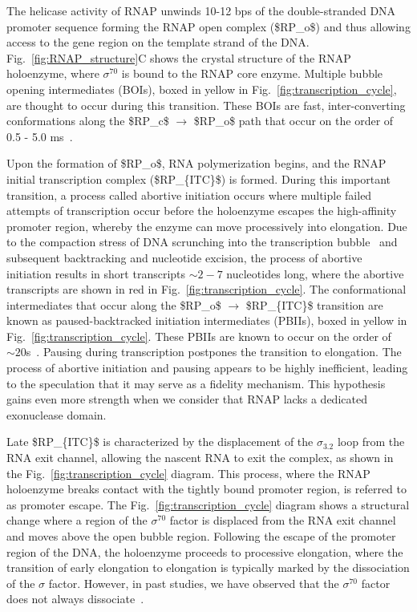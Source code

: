 The helicase activity of RNAP unwinds 10-12 \ac{bp}s of the double-stranded DNA promoter sequence forming the RNAP open complex (\ac{$RP_o$}) and thus allowing access to the gene region on the template strand of the DNA. 
Fig.~\ref{fig:RNAP_structure}C shows the crystal structure of the RNAP holoenzyme, where $\sigma^{70}$ is bound to the RNAP core enzyme. 
Multiple bubble opening intermediates (\ac{BOIs}), boxed in yellow in Fig.~\ref{fig:transcription_cycle}, are thought to occur during this transition. 
These \ac{BOIs} are fast, inter-converting conformations along the \ac{$RP_c$} $\rightarrow$ \ac{$RP_o$} path that occur on the order of 0.5 - 5.0 ms~\cite{lerner_JCP_2018, robb_JMB_2013}.

Upon the formation of \ac{$RP_o$}, RNA polymerization begins, and the RNAP initial transcription complex (\ac{$RP_{ITC}$}) is formed.
During this important transition, a process called abortive initiation occurs where multiple failed attempts of transcription occur before the holoenzyme escapes the high-affinity promoter region, whereby the enzyme can move processively into elongation. 
Due to the compaction stress of DNA scrunching into the transcription bubble~\cite{kapanidis_science_2006} and subsequent backtracking and nucleotide excision, the process of abortive initiation results in short transcripts $\sim2-7$ nucleotides long, where the abortive transcripts are shown in red in Fig.~\ref{fig:transcription_cycle}.
The conformational intermediates that occur along the \ac{$RP_o$}  $\rightarrow$ \ac{$RP_{ITC}$} transition are known as paused-backtracked initiation intermediates (\ac{PBIIs}), boxed in yellow in Fig.~\ref{fig:transcription_cycle}. 
These \ac{PBIIs} are known to occur on the order of $\sim20$s~\cite{kapanidis_science_2006,lerner_PNAS_2016,lerner_transcription_2017}.
Pausing during transcription postpones the transition to elongation.
The process of abortive initiation and pausing appears to be highly inefficient, leading to the speculation that it may serve as a fidelity mechanism. 
This hypothesis gains even more strength when we consider that RNAP lacks a dedicated exonuclease domain.

Late \ac{$RP_{ITC}$} is characterized by the displacement of the $\sigma_{3.2}$ loop from the RNA exit channel, allowing the nascent RNA to exit the complex, as shown in the Fig.~\ref{fig:transcription_cycle} diagram.
This process, where the RNAP holoenzyme breaks contact with the tightly bound promoter region, is referred to as promoter escape. 
The Fig.~\ref{fig:transcription_cycle} diagram shows a structural change where a region of the $\sigma^{70}$ factor is displaced from the RNA exit channel and moves above the open bubble region.
Following the escape of the promoter region of the DNA, the holoenzyme proceeds to processive elongation, where the transition of early elongation to elongation is typically marked by the dissociation of the $\sigma$ factor. 
However, in past studies, we have observed that the $\sigma^{70}$ factor does not always dissociate~\cite{kapanidis_MolCell_2005}.

